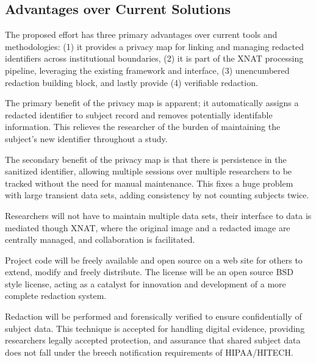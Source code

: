\subsection*{Advantages over Current Solutions}


The proposed effort has three primary advantages over current tools and methodologies: (1) it provides a privacy map for linking and managing redacted identifiers across institutional boundaries, (2) it is part of the XNAT processing pipeline, leveraging the existing framework and interface, (3) unencumbered redaction building block, and lastly provide (4) verifiable redaction. 

The primary benefit of the privacy map is apparent; it automatically assigns a redacted identifier to subject record and removes potentially identifable information. This relieves the researcher of the burden of maintaining the subject's new identifier throughout a study.

The secondary benefit of the privacy map is that there is persistence in the sanitized identifier,  allowing multiple sessions over multiple researchers to be tracked without the need for manual maintenance. This fixes a huge problem with large transient data sets, adding consistency by not counting subjects twice.

Researchers will not have to maintain multiple data sets, their interface to data is mediated though XNAT, where the original image and a redacted image are centrally managed, and collaboration is facilitated.

Project code will be freely available and open source on a web site for others to extend, modify and freely distribute. The license will be an open source BSD style license, acting as a catalyst for innovation and development of a more complete redaction system.

Redaction will be performed and forensically verified to ensure confidentially of subject data. This technique is accepted for handling digital evidence, providing researchers legally accepted protection, and assurance that shared subject data does not fall under the breech notification requirements of HIPAA/HITECH.
